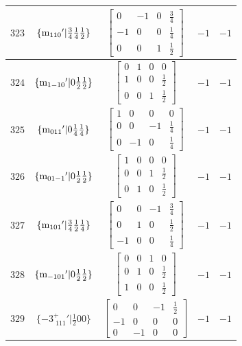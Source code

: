 \documentclass[fleqn,8pt]{jsarticle}
\begin{document}
\begin{longtable}{ccccc}
$ 323 $ & $ \{{\rm m}_{110}{}'|\frac{3}{4} \frac{1}{4} \frac{1}{2}\} $ & $ \begin{bmatrix} 0 & -1 & 0 & \frac{3}{4} \\ -1 & 0 & 0 & \frac{1}{4} \\ 0 & 0 & 1 & \frac{1}{2} \end{bmatrix} $ & $ -1 $ & $ -1 $ \\ \hline
$ 324 $ & $ \{{\rm m}_{1-10}{}'|0 \frac{1}{2} \frac{1}{2}\} $ & $ \begin{bmatrix} 0 & 1 & 0 & 0 \\ 1 & 0 & 0 & \frac{1}{2} \\ 0 & 0 & 1 & \frac{1}{2} \end{bmatrix} $ & $ -1 $ & $ -1 $ \\ \hline
$ 325 $ & $ \{{\rm m}_{011}{}'|0 \frac{1}{4} \frac{1}{4}\} $ & $ \begin{bmatrix} 1 & 0 & 0 & 0 \\ 0 & 0 & -1 & \frac{1}{4} \\ 0 & -1 & 0 & \frac{1}{4} \end{bmatrix} $ & $ -1 $ & $ -1 $ \\ \hline
$ 326 $ & $ \{{\rm m}_{01-1}{}'|0 \frac{1}{2} \frac{1}{2}\} $ & $ \begin{bmatrix} 1 & 0 & 0 & 0 \\ 0 & 0 & 1 & \frac{1}{2} \\ 0 & 1 & 0 & \frac{1}{2} \end{bmatrix} $ & $ -1 $ & $ -1 $ \\ \hline
$ 327 $ & $ \{{\rm m}_{101}{}'|\frac{3}{4} \frac{1}{2} \frac{1}{4}\} $ & $ \begin{bmatrix} 0 & 0 & -1 & \frac{3}{4} \\ 0 & 1 & 0 & \frac{1}{2} \\ -1 & 0 & 0 & \frac{1}{4} \end{bmatrix} $ & $ -1 $ & $ -1 $ \\ \hline
$ 328 $ & $ \{{\rm m}_{-101}{}'|0 \frac{1}{2} \frac{1}{2}\} $ & $ \begin{bmatrix} 0 & 0 & 1 & 0 \\ 0 & 1 & 0 & \frac{1}{2} \\ 1 & 0 & 0 & \frac{1}{2} \end{bmatrix} $ & $ -1 $ & $ -1 $ \\ \hline
$ 329 $ & $ \{-3^{+}_{\,\,111}{}'|\frac{1}{2} 0 0\} $ & $ \begin{bmatrix} 0 & 0 & -1 & \frac{1}{2} \\ -1 & 0 & 0 & 0 \\ 0 & -1 & 0 & 0 \end{bmatrix} $ & $ -1 $ & $ -1 $ \\ \hline

\end{longtable}
\end{document}
